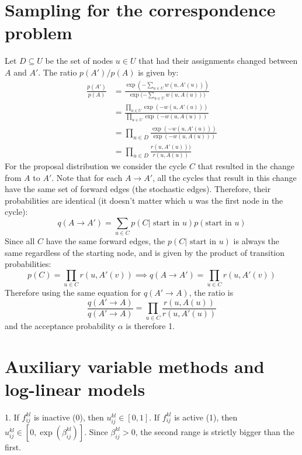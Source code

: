 \documentclass[11pt]{article}
\begin{document}
\newpage
\section{Sampling for the correspondence problem}
Let $D \subseteq U$ be the set of nodes $u \in U$ that had their assignments changed between $A$ and $A'$. The ratio $p(A')/p(A)$ is given by:
\begin{align*}
  \frac{p(A')}{p(A)} &= \frac{\exp{(-\sum_{u \in U} w(u,A'(u)))} }{\exp{(-\sum_{u \in U} w(u,A(u))} )}\\
  &= \frac{\prod_{u \in U} \exp{(-w(u,A'(u)))}}{\prod_{u \in U} \exp{(-w(u,A(u)))}}\\
  &= \prod_{u \in D} \frac{ \exp{(-w(u,A'(u)))}}{ \exp{(-w(u,A(u)))}}\\
  &= \prod_{u \in D} \frac{r(u,A'(u)))}{r(u,A(u))}
\end{align*}
For the proposal distribution we consider the cycle $C$ that resulted
in the change from $A$ to $A'$. Note that for each $A \to A'$, all the cycles that result in this change have the same set of forward edges (the stochastic edges). Therefore, their probabilities are identical (it doesn't matter which $u$ was the first node in the cycle):
\[q(A \to A') = \sum_{u \in C} p(C | \mbox{ start in } u) p(\mbox{start in } u)\]
Since all $C$ have the same forward edges, the $p(C | \mbox{ start in } u)$ is always the same regardless of the starting node, and is given by the product of transition probabilities:
\[ p(C) = \prod_{u \in C} r(u,A'(v)) \implies q(A \to A') = \prod_{u \in C} r(u,A'(v)) \]
Therefore using the same equation for $q(A' \to A)$, the ratio is
\[ \frac{q(A' \to A)}{q(A' \to A)} = \prod_{u \in C}\frac{r(u,A(u))}{r(u,A'(u))} \]
and the acceptance probability $\alpha$ is therefore 1.

\newpage
\section{Auxiliary variable methods and log-linear models}
1. If $f_{ij}^{kl}$ is inactive (0), then $u_{ij}^{kl} \in [0,1]$. If $f_{ij}^{kl}$ is active (1), then $u_{ij}^{kl} \in [0,\exp(\beta_{ij}^{kl})] $. Since $\beta_{ij}^{kl} > 0$, the second range is strictly bigger than the first.\\
\end{document}
